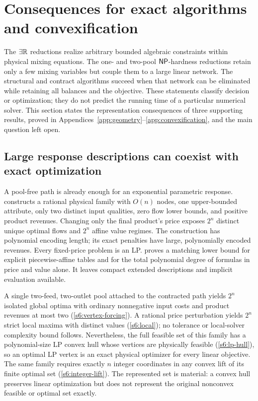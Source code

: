 \section{Consequences for exact algorithms and convexification}\label{s6:synthesis}

The $\exists\mathbb R$ reductions realize arbitrary bounded
algebraic constraints within physical mixing equations. The one- and two-pool
$\mathsf{NP}$-hardness reductions retain only a few mixing variables but couple
them to a large linear network. The structural and contract algorithms
succeed when that network can be eliminated while retaining all balances
and the objective. These statements classify decision or optimization;
they do not predict the running time of a particular numerical solver.
This section states the representation consequences of three supporting
results, proved in Appendices~\ref{app:geometry}--\ref{app:convexification},
and the main question left open.

\subsection{Large response descriptions can coexist with exact optimization}
A pool-free path is already enough for an exponential parametric response.
 constructs a rational physical family with
$O(n)$ nodes, one upper-bounded attribute, only two distinct input
qualities, zero flow lower bounds, and positive product revenues.
Changing only the final product's price exposes $2^n$ distinct unique
optimal flows and $2^n$ affine value regimes. The construction has
polynomial encoding length; its exact penalties have large, polynomially
encoded revenues. Every fixed-price problem is an LP.
 proves a matching lower bound for explicit
piecewise-affine tables and for the total polynomial degree of formulas
in price and value alone. It leaves compact extended descriptions and
implicit evaluation available.

A single two-feed, two-outlet pool attached to the contracted path yields
$2^n$ isolated global optima with ordinary nonnegative input costs and
product revenues at most two (\cref{s6:vertex-forcing}). A rational price
perturbation yields $2^n$ strict local maxima with distinct values
(\cref{s6:local}); no tolerance or local-solver complexity bound follows.
Nevertheless, the full feasible set of this family has a polynomial-size
LP convex hull whose vertices are physically feasible
(\cref{s6:lp-hull}), so an optimal LP vertex is an exact physical
optimizer for every linear objective. The same
family requires exactly $n$ integer coordinates in any convex lift of
its finite optimal set (\cref{s6:integer-lift}). The represented set is
material: a convex hull preserves linear optimization but does not
represent the original nonconvex feasible or optimal set exactly.

